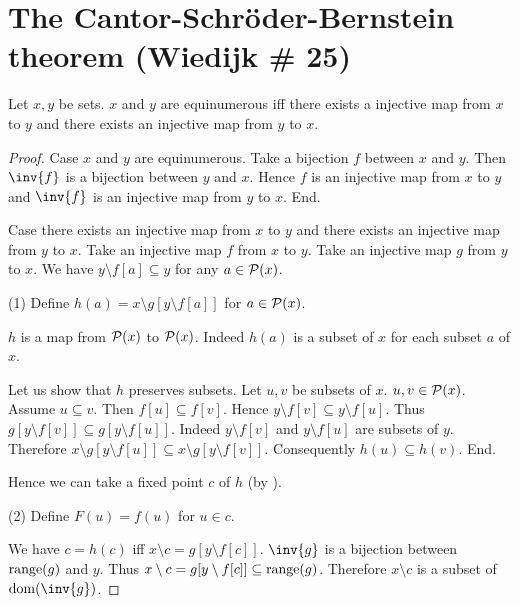 \documentclass{article}
\begin{document}
  \section*{The Cantor-Schröder-Bernstein theorem (Wiedijk \# 25)}

  \begin{forthel}








    \begin{theorem*}\label{CSB}
      Let $x,y$ be sets.
      $x$ and $y$ are equinumerous iff there exists a injective map from $x$ to
      $y$ and there exists an injective map from $y$ to $x$.
    \end{theorem*}
    \begin{proof}
      Case $x$ and $y$ are equinumerous.
        Take a bijection $f$ between $x$ and $y$.
        Then $\inv{f}$ is a bijection between $y$ and $x$.
        Hence $f$ is an injective map from $x$ to $y$ and $\inv{f}$ is an
        injective map from $y$ to $x$.
      End.

      Case there exists an injective map from $x$ to $y$ and there exists an
      injective map from $y$ to $x$.
        Take an injective map $f$ from $x$ to $y$.
        Take an injective map $g$ from $y$ to $x$.
        We have $y \setminus f[a] \subseteq y$ for any $a \in \mathcal{P}(x)$.

        (1) Define $h(a) = x \setminus g[y \setminus f[a]]$ for $a \in \mathcal{P}(x)$.

        $h$ is a map from $\mathcal{P}(x)$ to $\mathcal{P}(x)$.
        Indeed $h(a)$ is a subset of $x$ for each subset $a$ of $x$.

        Let us show that $h$ preserves subsets.
          Let $u, v$ be subsets of $x$. $u,v \in \mathcal{P}(x)$.
          Assume $u \subseteq v$.
          Then $f[u] \subseteq f[v]$.
          Hence $y \setminus f[v] \subseteq y \setminus f[u]$.
          Thus $g[y \setminus f[v]] \subseteq g[y \setminus f[u]]$.
          Indeed $y \setminus f[v]$ and $y \setminus f[u]$ are subsets of $y$.
          Therefore $x \setminus g[y \setminus f[u]] \subseteq
          x \setminus g[y \setminus f[v]]$.
          Consequently $h(u) \subseteq h(v)$. 
        End.

        Hence we can take a fixed point $c$ of $h$ (by ).

        (2) Define $F(u) = f(u)$ for $u \in c$.

        We have $c = h(c)$ iff $x \setminus c = g[y \setminus f[c]]$.
        $\inv{g}$ is a bijection between $\operatorname{range}(g)$ and $y$.
        Thus $x \setminus c = g[y \setminus f[c]] \subseteq \operatorname{range}(g)$.
        Therefore $x \setminus c$ is a subset of $\dom(\inv{g})$.


\end{proof}
\end{forthel}
\end{document}
